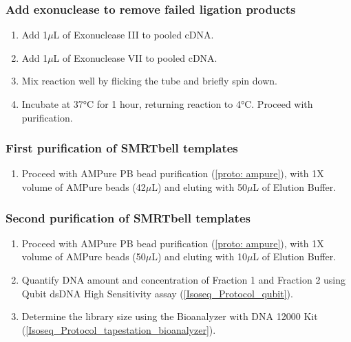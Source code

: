 \subsubsection{Add exonuclease to remove failed ligation products}
\begin{enumerate}
	\item Add 1$\mu$L of Exonuclease III to pooled cDNA. 
	\item Add 1$\mu$L of Exonuclease VII to pooled cDNA.
	\item Mix reaction well by flicking the tube and briefly spin down. 
	\item Incubate at 37°C for 1 hour, returning reaction to 4°C. Proceed with purification. 
\end{enumerate}

\subsubsection{First purification of SMRTbell templates}
\begin{enumerate}
	\item Proceed with AMPure PB bead purification (\cref{proto: ampure}), with 1X volume of AMPure beads (42$\mu$L) and eluting with 50$\mu$L of Elution Buffer.
\end{enumerate} 

\subsubsection{Second purification of SMRTbell templates}
\begin{enumerate}
	\item Proceed with AMPure PB bead purification (\cref{proto: ampure}), with 1X volume of AMPure beads (50$\mu$L) and eluting with 10$\mu$L of Elution Buffer.
	\item Quantify DNA amount and concentration of Fraction 1 and Fraction 2 using Qubit dsDNA High Sensitivity assay (\cref{Isoseq_Protocol_qubit}). 
	\item Determine the library size using the Bioanalyzer with DNA 12000 Kit (\cref{Isoseq_Protocol_tapestation_bioanalyzer}). 
\end{enumerate} 
\resumetocwriting